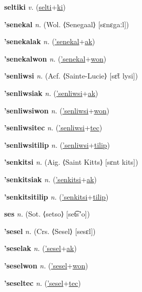 \textbf{\hypertarget{seltiki}{seltiki}} \textit{v.} (\hyperlink{selti}{selti}+\allowbreak \hyperlink{ki}{ki})


\textbf{\hypertarget{'senekal}{'senekal}} \textit{n.} (Wol. ⟨Senegaal⟩ [sɛnɛgaːl])


\textbf{\hypertarget{'senekalak}{'senekalak}} \textit{n.} (\hyperlink{'senekal}{'senekal}+\allowbreak \hyperlink{ak}{ak})


\textbf{\hypertarget{'senekalwon}{'senekalwon}} \textit{n.} (\hyperlink{'senekal}{'senekal}+\allowbreak \hyperlink{won}{won})


\textbf{\hypertarget{'senliwsi}{'senliwsi}} \textit{n.} (Acf. ⟨Sainte-Lucie⟩ [sɛ̃t lysi])


\textbf{\hypertarget{'senliwsiak}{'senliwsiak}} \textit{n.} (\hyperlink{'senliwsi}{'senliwsi}+\allowbreak \hyperlink{ak}{ak})


\textbf{\hypertarget{'senliwsiwon}{'senliwsiwon}} \textit{n.} (\hyperlink{'senliwsi}{'senliwsi}+\allowbreak \hyperlink{won}{won})


\textbf{\hypertarget{'senliwsitec}{'senliwsitec}} \textit{n.} (\hyperlink{'senliwsi}{'senliwsi}+\allowbreak \hyperlink{tec}{tec})


\textbf{\hypertarget{'senliwsitilip}{'senliwsitilip}} \textit{n.} (\hyperlink{'senliwsi}{'senliwsi}+\allowbreak \hyperlink{tilip}{tilip})


\textbf{\hypertarget{'senkitsi}{'senkitsi}} \textit{n.} (Aig. ⟨Saint Kitts⟩ [sɛnt kits])


\textbf{\hypertarget{'senkitsiak}{'senkitsiak}} \textit{n.} (\hyperlink{'senkitsi}{'senkitsi}+\allowbreak \hyperlink{ak}{ak})


\textbf{\hypertarget{'senkitsitilip}{'senkitsitilip}} \textit{n.} (\hyperlink{'senkitsi}{'senkitsi}+\allowbreak \hyperlink{tilip}{tilip})


\textbf{\hypertarget{ses}{ses}} \textit{n.} (Sot. ⟨setso⟩ [set͡sʼo])


\textbf{\hypertarget{'sesel}{'sesel}} \textit{n.} (Crs. ⟨Sesel⟩ [sesɛl])


\textbf{\hypertarget{'seselak}{'seselak}} \textit{n.} (\hyperlink{'sesel}{'sesel}+\allowbreak \hyperlink{ak}{ak})


\textbf{\hypertarget{'seselwon}{'seselwon}} \textit{n.} (\hyperlink{'sesel}{'sesel}+\allowbreak \hyperlink{won}{won})


\textbf{\hypertarget{'seseltec}{'seseltec}} \textit{n.} (\hyperlink{'sesel}{'sesel}+\allowbreak \hyperlink{tec}{tec})


